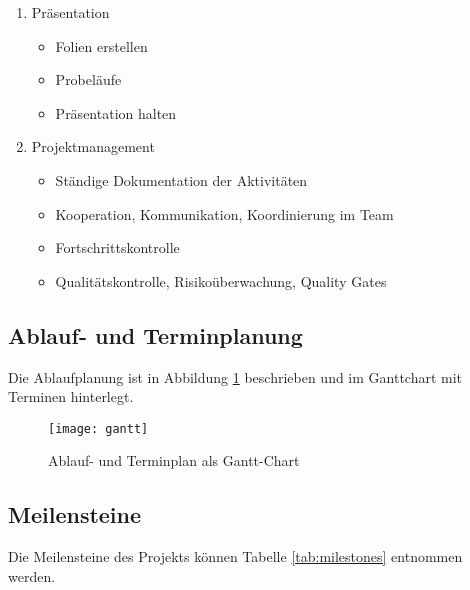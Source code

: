\begin{enumerate}
\item Präsentation
\begin{itemize}
\item Folien erstellen
\item Probeläufe
\item Präsentation halten

\end{itemize}

\item Projektmanagement
\begin{itemize}
\item Ständige Dokumentation der Aktivitäten
\item Kooperation, Kommunikation, Koordinierung im Team
\item Fortschrittskontrolle
\item Qualitätskontrolle, Risikoüberwachung, Quality Gates
\end{itemize}

\end{enumerate}
 
\subsection{Ablauf- und Terminplanung}
Die Ablaufplanung ist in Abbildung \ref{fig:gantt} beschrieben und im Ganttchart mit Terminen hinterlegt.
\begin{figure}[!h]
    \centering
    \texttt{[image: gantt]}
    \caption{Ablauf- und Terminplan als Gantt-Chart}
    \label{fig:gantt}
\end{figure}

 \subsection{Meilensteine}
Die Meilensteine des Projekts können Tabelle \ref{tab:milestones} entnommen werden.
 

